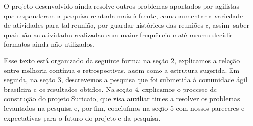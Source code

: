 O projeto desenvolvido ainda resolve outros problemas apontados por agilistas que responderam a pesquisa relatada mais à frente, como aumentar a variedade de atividades para tal reunião, por guardar históricos das reuniões e, assim, saber quais são as atividades realizadas com maior frequência e até mesmo decidir formatos ainda não utilizados.

Esse texto está organizado da seguinte forma: na seção 2, explicamos a relação entre melhoria contínua e retrospectivas, assim como a estrutura sugerida. Em seguida, na seção 3, descrevemos a pesquisa que foi submetida à comunidade ágil brasileira e os resultados obtidos. Na seção 4, explicamos o processo de construção do projeto Suricato, que visa auxiliar times a resolver os problemas levantados na pesquisa e, por fim, concluímos na seção 5 com nossos pareceres e expectativas para o futuro do projeto e da pesquisa.
